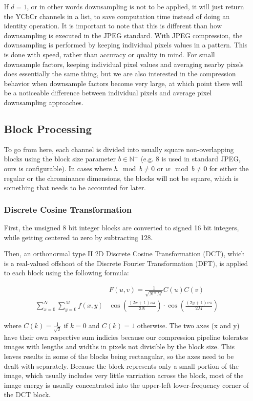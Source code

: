 If \(d = 1\), or in other words downsampling is not to be applied, it will just return the YCbCr channels in a list, to save computation time instead of doing an identity operation.
It is important to note that this is different than how downsampling is executed in the JPEG standard. 
With JPEG compression, the downsampling is performed by keeping individual pixels values in a pattern.
This is done with speed, rather than accuracy or quality in mind. 
For small downsample factors, keeping individual pixel values and averaging nearby pixels does essentially the same thing, but we are also interested in the compression behavior when downsample factors become very large, at which point there will be a noticeable difference between individual pixels and average pixel downsampling approaches.

\subsection{Block Processing}
To go from here, each channel is divided into usually square non-overlapping blocks using the block size parameter \(b \in \mathbb{N}^+\) (e.g. 8 is used in standard JPEG, ours is configurable). In cases where \(h \mod b \neq 0\) or \(w \mod b \neq 0\) for either the regular or the chrominance dimensions, the blocks will not be square, which is something that needs to be accounted for later. 

\subsubsection{Discrete Cosine Transformation}
First, the unsigned 8 bit integer blocks are converted to signed 16 bit integers, while getting centered to zero by subtracting 128.

Then, an orthonormal type II 2D Discrete Cosine Transformation (DCT), which is a real-valued offshoot of the Discrete Fourier Transformation (DFT), is applied to each block using the following formula:

\begin{align}
  &F(u, v) = \frac{1}{\sqrt{N*M}} C(u)C(v) \\ \sum_{x=0}^{N} \sum_{y=0}^{M} f(x,y)
  &\cos\left( \frac{(2x+1)u\pi}{2N} \right) \cdot \cos\left( \frac{(2y+1)v\pi}{2M} \right)
\end{align}

where $C(k) = \frac{1}{\sqrt{2}}$ if $k = 0$ and $C(k) = 1$ otherwise. The two axes (x and y) have their own respective sum indicies because our compression pipeline tolerates images with lengths and widths in pixels not divisible by the block size. This leaves results in some of the blocks being rectangular, so the axes need to be dealt with separately. Because the block represents only a small portion of the image, which usually includes very little varriation across the block, most of the image energy is usually concentrated into the upper-left lower-frequency corner of the DCT block.

